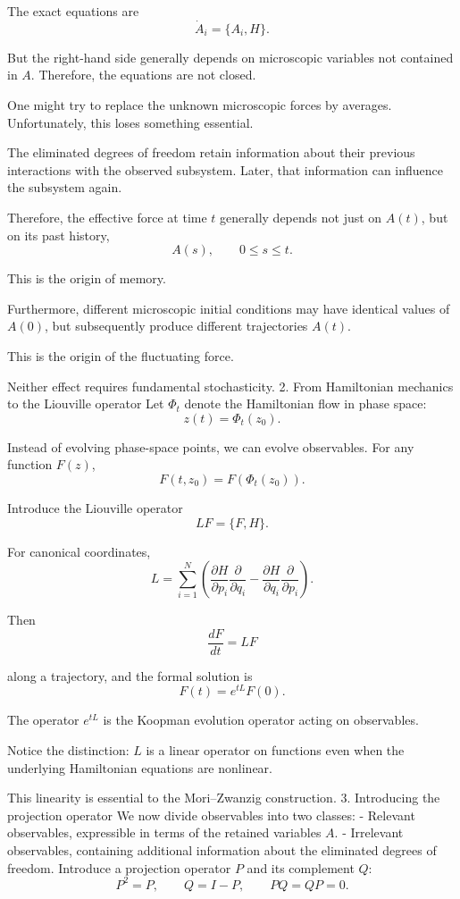 The exact equations are
\[
\dot A_i=\{A_i,H\}.
\]

But the right-hand side generally depends on microscopic variables not contained in \(A\). Therefore, the equations are not closed.

One might try to replace the unknown microscopic forces by averages. Unfortunately, this loses something essential.

The eliminated degrees of freedom retain information about their previous interactions with the observed subsystem. Later, that information can influence the subsystem again.

Therefore, the effective force at time \(t\) generally depends not just on \(A(t)\), but on its past history,
\[
A(s),\qquad 0\leq s\leq t.
\]

This is the origin of memory.

Furthermore, different microscopic initial conditions may have identical values of \(A(0)\), but subsequently produce different trajectories \(A(t)\).

This is the origin of the fluctuating force.

Neither effect requires fundamental stochasticity.
2. From Hamiltonian mechanics to the Liouville operator
Let \(\Phi_t\) denote the Hamiltonian flow in phase space:
\[
z(t)=\Phi_t(z_0).
\]

Instead of evolving phase-space points, we can evolve observables. For any function \(F(z)\),
\[
F(t,z_0)=F(\Phi_t(z_0)).
\]

Introduce the Liouville operator
\[
\boxed{
LF=\{F,H\}.
}
\]

For canonical coordinates,
\[
L
=
\sum_{i=1}^N
\left(
\frac{\partial H}{\partial p_i}
\frac{\partial}{\partial q_i}
-
\frac{\partial H}{\partial q_i}
\frac{\partial}{\partial p_i}
\right).
\]

Then
\[
\frac{dF}{dt}=LF
\]

along a trajectory, and the formal solution is
\[
\boxed{F(t)=e^{tL}F(0).}
\]

The operator \(e^{tL}\) is the Koopman evolution operator acting on observables.

Notice the distinction: \(L\) is a linear operator on functions even when the underlying Hamiltonian equations are nonlinear.

This linearity is essential to the Mori–Zwanzig construction.
3. Introducing the projection operator
We now divide observables into two classes:
- Relevant observables, expressible in terms of the retained variables \(A\).
- Irrelevant observables, containing additional information about the eliminated degrees of freedom.
Introduce a projection operator \(P\) and its complement \(Q\):
\[
\boxed{
P^2=P,\qquad Q=I-P,\qquad PQ=QP=0.
}
\]

